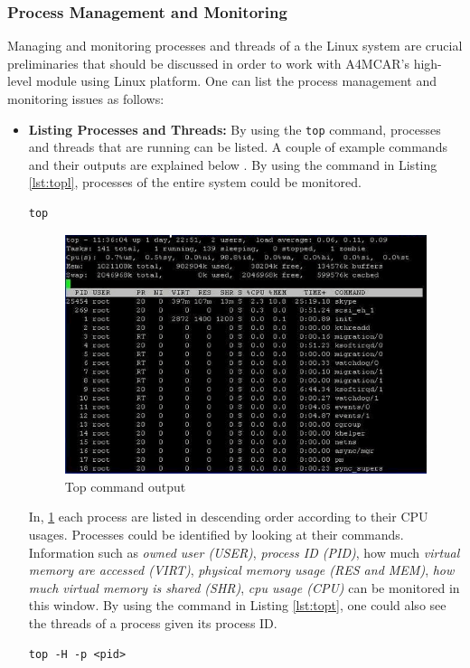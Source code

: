 \subsubsection{Process Management and Monitoring}
Managing and monitoring processes and threads of a the Linux system are crucial preliminaries that should be discussed in order to work with A4MCAR's high-level module using Linux platform. One can list the process management and monitoring issues as follows:
\begin{itemize}
	\item \textbf{Listing Processes and Threads:}
	By using the \texttt{top} command, processes and threads that are running can be listed. A couple of example commands and their outputs are explained below \cite{topexamples}. By using the command in Listing \ref{lst:topl}, processes of the entire system could be monitored.
	\begin{lstlisting}[caption={Top command in Linux shell},label={lst:topl},style=bash]
		top
	\end{lstlisting}
	\begin{figure}[!ht]
		\centering
		\captionsetup{justification=centering}
		\includegraphics[width=\textwidth]{content/images/topexample1.png}
		\caption{Top command output}
		\label{fig:topexample1}
	\end{figure}
	In, \ref{fig:topexample1} each process are listed in descending order according to their CPU usages. Processes could be identified by looking at their commands. Information such as \textit{owned user (USER)}, \textit{process ID (PID)}, how much \textit{virtual memory are accessed (VIRT)}, \textit{physical memory usage (RES and MEM)}, \textit{how much virtual memory is shared (SHR)}, \textit{cpu usage (CPU)} can be monitored in this window. By using the command in Listing \ref{lst:topt}, one could also see the threads of a process given its process ID.
	\begin{lstlisting}[caption={Using top to monitor threads},label={lst:topt},style=bash]
	top -H -p <pid>
	\end{lstlisting}
	

\end{itemize}
